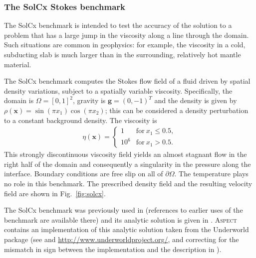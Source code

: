 \documentclass{article}
\newcommand{\aspect}{\textsc{Aspect}}
\begin{document}
\subsubsection{The SolCx Stokes benchmark}
\label{sec:benchmark-solcx}

The SolCx benchmark is intended to test the accuracy of the solution to a
problem that has a large jump in the viscosity along a line through the
domain. Such situations are common in geophysics: for example, the viscosity
in a cold, subducting slab is much larger than in the surrounding, relatively
hot mantle material.

The SolCx benchmark computes the Stokes flow field of a fluid driven by
spatial density variations, subject to a spatially variable
viscosity. Specifically, the domain is $\Omega=[0,1]^2$, gravity is $\mathbf
g=(0,-1)^T$ and the density is given
by $\rho(\mathbf x)=\sin(\pi x_1)\cos(\pi x_2)$; this can be considered a
density perturbation to a constant background density. The viscosity is
\begin{align*}
  \eta(\mathbf x) = \left\{
    \begin{matrix}
      1 & \text{for}\ x_1 \le 0.5, \\
      10^6 & \text{for}\ x_1  > 0.5.
    \end{matrix}
  \right.
\end{align*}
This strongly discontinuous viscosity field yields an almost stagnant flow in
the right half of the domain and consequently a singularity in the pressure
along the interface.
Boundary conditions are free slip on all of $\partial\Omega$. The temperature
plays no role in this benchmark. The prescribed density field and the
resulting velocity field are shown in Fig.~\ref{fig:solcx}.

The SolCx benchmark was previously used in \cite[Section 4.1.1]{DMGT11}
(references to earlier uses of the benchmark are available there) and its analytic
solution is given in \cite{Zho96}. \aspect{} contains an implementation of
this analytic solution taken from the Underworld package (see \cite{MQLMAM07}
and \url{http://www.underworldproject.org/}, and correcting for the mismatch
in sign between the implementation and the description in \cite{DMGT11}).
\end{document}
